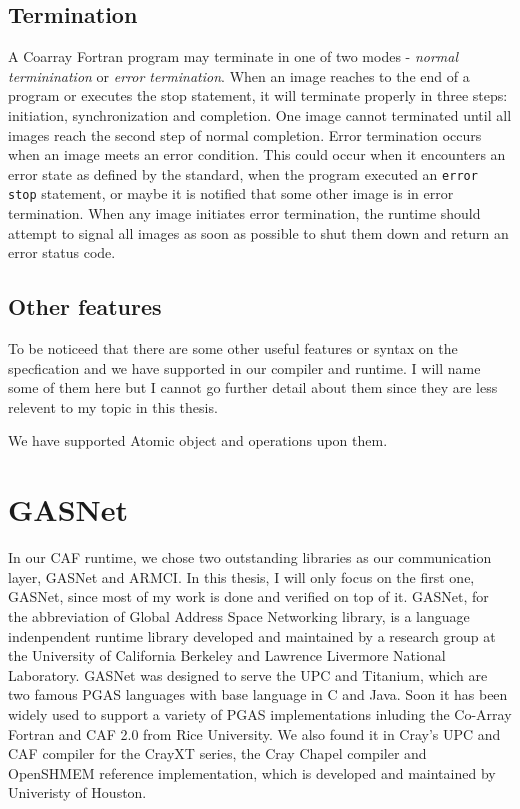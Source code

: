 
\subsection{Termination}
A Coarray Fortran program may terminate in one of two modes - \emph{normal terminination} or \emph{error termination}. When an image reaches to the end of a program or executes the stop statement, it will terminate properly in three steps: initiation, synchronization and completion. One image cannot terminated until all images reach the second step of normal completion. Error termination occurs when an image meets an error condition. This could occur when it encounters an error state as defined by the standard, when the program executed an \texttt{error stop} statement, or maybe it is notified that some other image is in error termination. When any image initiates error termination, the runtime should attempt to signal all images as soon as possible to shut them down and return an error status code.
\subsection{Other features}
To be noticeed that there are some other useful features or syntax on the specfication and we have supported in our compiler and runtime. I will name some of them here but I cannot go further detail about them since they are less relevent to my topic in this thesis. 

We have supported Atomic object and operations upon them. 
\section{GASNet}
In our CAF runtime, we chose two outstanding libraries as our communication layer, GASNet and ARMCI. In this thesis, I will only focus on the first one, GASNet, since most of my work is done and verified on top of it. GASNet\cite{bonachea2002gasnet}\cite{bonachea2002gasnetspec}, for the abbreviation of Global Address Space Networking library, is a language indenpendent runtime library developed and maintained by a research group at the University of California Berkeley and Lawrence Livermore National Laboratory. GASNet was designed to serve the UPC and Titanium, which are two famous PGAS languages with base language in C and Java. Soon it has been widely used to support a variety of PGAS implementations inluding the Co-Array Fortran and CAF 2.0 from Rice University. We also found it in Cray's UPC and CAF compiler for the CrayXT series, the Cray Chapel compiler and OpenSHMEM reference implementation, which is developed and maintained by Univeristy of Houston. 

